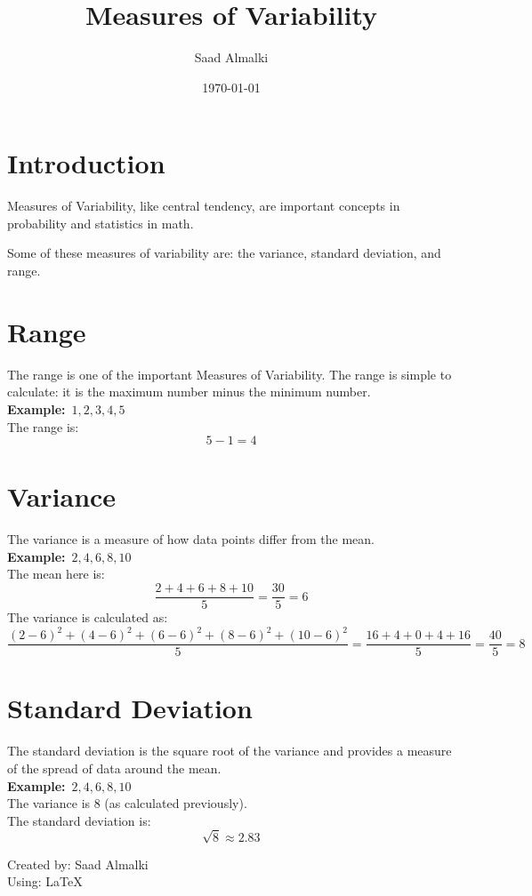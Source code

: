 \documentclass[12pt]{article}
\title{Measures of Variability}
\author{Saad Almalki}
\date{\today}
\begin{document}
\maketitle

\section{Introduction} 
Measures of Variability, like central tendency, are important concepts in probability and statistics in math.

Some of these measures of variability are: the variance, standard deviation, and range.

\section{Range} 
The range is one of the important Measures of Variability. The range is simple to calculate: it is the maximum number minus the minimum number.\\
\textbf{Example:}\
$1, 2, 3, 4, 5$\\
The range is: 
\[ 5 - 1 = 4 \]

\section{Variance}
The variance is a measure of how data points differ from the mean.\\
\textbf{Example:}\
$2, 4, 6, 8, 10$\\
The mean here is:
\[
\frac{2 + 4 + 6 + 8 + 10}{5} = \frac{30}{5} = 6
\]
The variance is calculated as:
\[
\frac{(2-6)^2 + (4-6)^2 + (6-6)^2 + (8-6)^2 + (10-6)^2}{5} = \frac{16 + 4 + 0 + 4 + 16}{5} = \frac{40}{5} = 8
\]

\section{Standard Deviation}
The standard deviation is the square root of the variance and provides a measure of the spread of data around the mean.\\
\textbf{Example:}\
$2, 4, 6, 8, 10$\\
The variance is 8 (as calculated previously).\\
The standard deviation is:
\[
\sqrt{8} \approx 2.83
\]

\begin{flushright}
Created by: Saad Almalki \\
Using: \LaTeX
\end{flushright}
\end{document}

